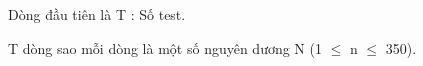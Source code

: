 Dòng đầu tiên là T : Số test.  

   T dòng sao mỗi dòng là một số nguyên dương N (1 $\le$ n  $\le$ 350).  

\